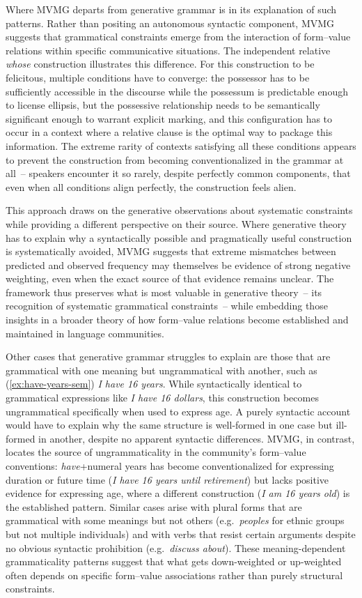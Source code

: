 \documentclass[12pt,letterpaper]{article}
\newcommand{\mention}[1]{\textit{#1}}
\begin{document}
Where MVMG departs from generative grammar is in its explanation of such patterns. Rather than positing an autonomous syntactic component, MVMG suggests that grammatical constraints emerge from the interaction of form--value relations within specific communicative situations. The independent relative \mention{whose} construction illustrates this difference. For this construction to be felicitous, multiple conditions have to converge: the possessor has to be sufficiently accessible in the discourse while the possessum is predictable enough to license ellipsis, but the possessive relationship needs to be semantically significant enough to warrant explicit marking, and this configuration has to occur in a context where a relative clause is the optimal way to package this information. The extreme rarity of contexts satisfying all these conditions appears to prevent the construction from becoming conventionalized in the grammar at all~--  speakers encounter it so rarely, despite perfectly common components, that even when all conditions align perfectly, the construction feels alien.

This approach draws on the generative observations about systematic constraints while providing a different perspective on their source. Where generative theory has to explain why a syntactically possible and pragmatically useful construction is systematically avoided, MVMG suggests that extreme mismatches between predicted and observed frequency may themselves be evidence of strong negative weighting, even when the exact source of that evidence remains unclear. The framework thus preserves what is most valuable in generative theory~--  its recognition of systematic grammatical constraints~--  while embedding those insights in a broader theory of how form--value relations become established and maintained in language communities.

Other cases that generative grammar struggles to explain are those that are grammatical with one meaning but ungrammatical with another, such as (\ref{ex:have-years-sem}) \textit{I have 16 years}. While syntactically identical to grammatical expressions like \mention{I have 16 dollars}, this construction becomes ungrammatical specifically when used to express age. A purely syntactic account would have to explain why the same structure is well-formed in one case but ill-formed in another, despite no apparent syntactic differences. MVMG, in contrast, locates the source of ungrammaticality in the community's form--value conventions: \mention{have}+numeral years has become conventionalized for expressing duration or future time (\textit{I have 16 years until retirement}) but lacks positive evidence for expressing age, where a different construction (\textit{I am 16 years old}) is the established pattern. Similar cases arise with plural forms that are grammatical with some meanings but not others (e.g.\, \mention{peoples} for ethnic groups but not multiple individuals) and with verbs that resist certain arguments despite no obvious syntactic prohibition (e.g.\, \mention{discuss about}). These meaning-dependent grammaticality patterns suggest that what gets down-weighted or up-weighted often depends on specific form--value associations rather than purely structural constraints.
\end{document}
